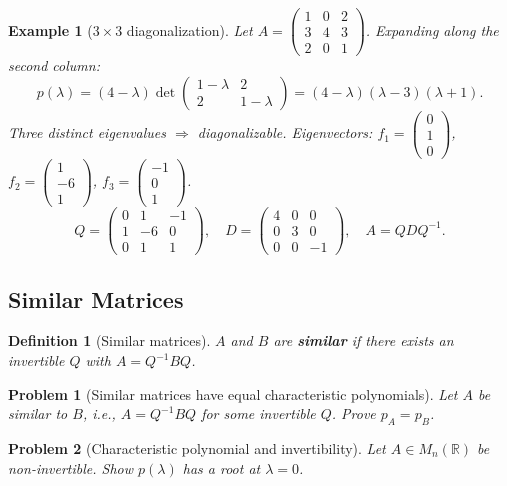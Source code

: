 \documentclass{article}
\newtheorem{definition}{Definition}
\newtheorem{problem}{Problem}
\newtheorem*{example}{Example}
\begin{document}
\begin{example}[$3\times3$ diagonalization]
    Let $A=\begin{pmatrix}1&0&2\\3&4&3\\2&0&1\end{pmatrix}$. Expanding along the second column:
    \[p(\lambda) = (4-\lambda)\det\begin{pmatrix}1-\lambda&2\\2&1-\lambda\end{pmatrix} = (4-\lambda)(\lambda-3)(\lambda+1).\]
    Three distinct eigenvalues $\Rightarrow$ diagonalizable. Eigenvectors: $f_1=\begin{pmatrix}0\\1\\0\end{pmatrix}$, $f_2=\begin{pmatrix}1\\-6\\1\end{pmatrix}$, $f_3=\begin{pmatrix}-1\\0\\1\end{pmatrix}$.
    \[Q = \begin{pmatrix}0&1&-1\\1&-6&0\\0&1&1\end{pmatrix}, \quad D = \begin{pmatrix}4&0&0\\0&3&0\\0&0&-1\end{pmatrix}, \quad A = QDQ^{-1}.\]
\end{example}

\subsection{Similar Matrices}
\begin{definition}[Similar matrices]
    $A$ and $B$ are \textbf{similar} if there exists an invertible $Q$ with $A = Q^{-1}BQ$.
\end{definition}
\begin{problem}[Similar matrices have equal characteristic polynomials]
    Let $A$ be similar to $B$, i.e., $A = Q^{-1}BQ$ for some invertible $Q$. Prove $p_A = p_B$.
\end{problem}
\begin{problem}[Characteristic polynomial and invertibility]
    Let $A\in M_n(\mathbb{R})$ be non-invertible. Show $p(\lambda)$ has a root at $\lambda = 0$.
\end{problem}
\end{document}
